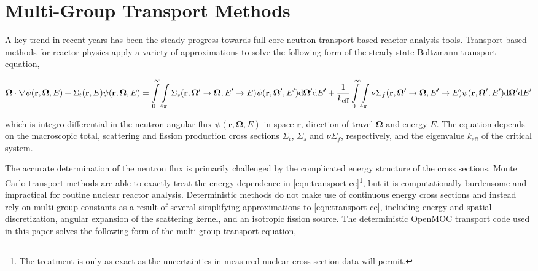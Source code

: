 \section{Multi-Group Transport Methods}
\label{sec:mg-theory}

A key trend in recent years has been the steady progress towards full-core neutron transport-based reactor analysis tools. Transport-based methods for reactor physics apply a variety of approximations to solve the following form of the steady-state Boltzmann transport equation,

\begin{dmath}
\label{eqn:transport-ce}
\mathbf{\Omega} \cdot \nabla \psi(\mathbf{r},\mathbf{\Omega},E) + \Sigma_{t}(\mathbf{r},E)\psi(\mathbf{r},\mathbf{\Omega},E) = \int\displaylimits_{0}^{\infty}\int\displaylimits_{4\pi} \Sigma_{s}(\mathbf{r},{\mathbf{\Omega'}\rightarrow\mathbf{\Omega}},{E'\rightarrow E}) \psi(\mathbf{r},\mathbf{\Omega'},E') \mathrm{d}\mathbf{\Omega'} \mathrm{d}E' + \frac{1}{k_{\textrm{eff}}}\int\displaylimits_{0}^{\infty}\int\displaylimits_{4\pi} \nu\Sigma_{f}(\mathbf{r},{\mathbf{\Omega'}\rightarrow \mathbf{\Omega}},{E'\rightarrow E})\psi(\mathbf{r},\mathbf{\Omega'},E') \mathrm{d}\mathbf{\Omega'} \mathrm{d}E'
\end{dmath}

\noindent which is integro-differential in the neutron angular flux $\psi(\mathbf{r},\mathbf{\Omega},E)$ in space $\mathbf{r}$, direction of travel $\mathbf{\Omega}$ and energy $E$. The equation depends on the macroscopic total, scattering and fission production cross sections $\Sigma_{t}$, $\Sigma_{s}$ and $\nu\Sigma_{f}$, respectively, and the eigenvalue $k_{\textrm{eff}}$ of the critical system.

The accurate determination of the neutron flux is primarily challenged by the complicated energy structure of the cross sections. Monte Carlo transport methods are able to exactly treat the energy dependence in \cref{eqn:transport-ce}\footnote{The treatment is only as exact as the uncertainties in measured nuclear cross section data will permit.}, but it is computationally burdensome and impractical for routine nuclear reactor analysis. Deterministic methods do not make use of continuous energy cross sections and instead rely on multi-group constants as a result of several simplifying approximations to \cref{eqn:transport-ce}, including energy and spatial discretization, angular expansion of the scattering kernel, and an isotropic fission source. The deterministic OpenMOC transport code used in this paper solves the following form of the multi-group transport equation,

